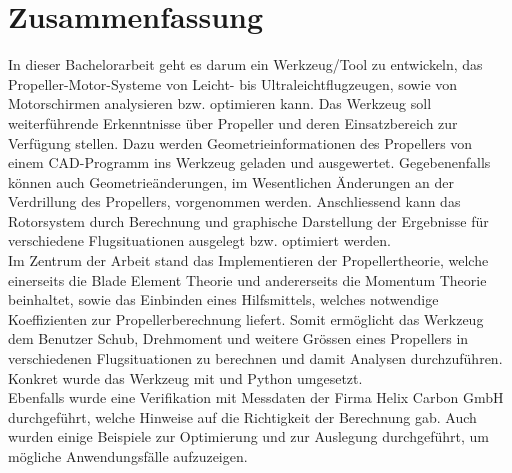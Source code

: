 \section*{Zusammenfassung}
\label{sec:zusammenfassung}


In dieser Bachelorarbeit geht es darum ein Werkzeug/Tool zu entwickeln, das Propeller-Motor-Systeme von Leicht- bis Ultraleichtflugzeugen, sowie von Motorschirmen analysieren bzw. optimieren kann. Das Werkzeug soll weiterführende Erkenntnisse über Propeller und deren Einsatzbereich zur Verfügung stellen. Dazu werden Geometrieinformationen des Propellers von einem CAD-Programm ins Werkzeug geladen und ausgewertet. Gegebenenfalls können auch Geometrieänderungen, im Wesentlichen Änderungen an der Verdrillung des Propellers, vorgenommen werden. Anschliessend kann das Rotorsystem durch Berechnung und graphische Darstellung der Ergebnisse für verschiedene Flugsituationen ausgelegt bzw. optimiert werden. 
\\
Im Zentrum der Arbeit stand das Implementieren der Propellertheorie, welche einerseits die Blade Element Theorie und andererseits die Momentum Theorie beinhaltet, sowie das Einbinden eines Hilfsmittels, welches notwendige Koeffizienten zur Propellerberechnung liefert. Somit ermöglicht das Werkzeug dem Benutzer Schub, Drehmoment und weitere Grössen eines Propellers in verschiedenen Flugsituationen zu berechnen und damit Analysen durchzuführen. Konkret wurde das Werkzeug mit \MATLAB\cite{matlab} und Python\cite{python} umgesetzt.
\\
Ebenfalls wurde eine Verifikation mit Messdaten der Firma Helix Carbon GmbH durchgeführt, welche Hinweise auf die Richtigkeit der Berechnung gab. Auch wurden einige Beispiele zur Optimierung und zur Auslegung durchgeführt, um mögliche Anwendungsfälle aufzuzeigen.
